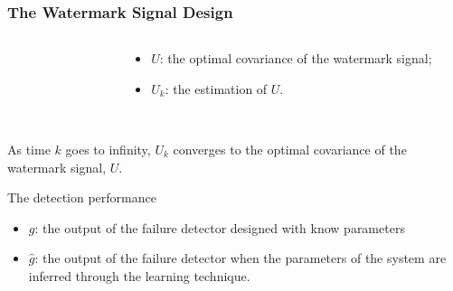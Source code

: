 \documentclass[10pt]{beamer}
\newcommand{\tikzdir}[1]{#1.tikz}
\newcommand{\inputtikz}[1]{}}
\begin{document}
\begin{frame}
  \frametitle{The Watermark Signal Design}
  \begin{columns}
    \begin{column}{0.6\textwidth}
      \begin{figure}[h!]
        \inputtikz{errU1_te}
      \end{figure}
    \end{column}
    \begin{column}{0.4\textwidth}
      \begin{itemize}
      \item $U$: the optimal covariance of the watermark signal;
      \item $U_k$: the estimation of $U$.
      \end{itemize}
    \end{column}
  \end{columns}
 ~\\
  As time $k$ goes to infinity, $U_k$ converges to the optimal covariance of the watermark signal, $U$.
\end{frame}

\begin{frame}{The detection performance}
  \begin{itemize}
  \item $g$: the output of the failure detector designed with know parameters
  \item $\hat g$: the output of the failure detector when the parameters of the system are inferred through the learning technique. 
  \end{itemize}
  \begin{figure}[h!]
    \centering
    \inputtikz{gng_te}
  \end{figure}
\end{frame}
\end{document}
